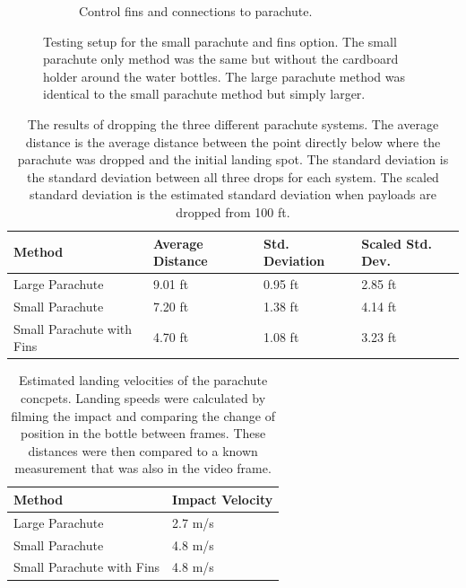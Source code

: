 \documentclass[]{auvsi_doc}
\begin{document}
\begin{figure}[ht]
\begin{subfigure}{0.49\linewidth}
     \caption{Control fins and connections to parachute.}\label{fig:ControlFins}
   \end{subfigure}
\caption{Testing setup for the small parachute and fins option. The small parachute only method was the same but without the cardboard holder around the water bottles. The large parachute method was identical to the small parachute method but simply larger.}
\label{fig:combined}
\end{figure}

\begin{table}[h!]
\caption{The results of dropping the three different parachute systems. The average distance is the average distance between the point directly below where the parachute was dropped and the initial landing spot. The standard deviation is the standard deviation between all three drops for each system. The scaled standard deviation is the estimated standard deviation when payloads are dropped from 100 ft. }
\label{table:results}

\begin{tabular}{| l | l | l | l |}
\hline
\rowcolor[HTML]{C0C0C0}
Method & Average Distance & Std. Deviation & Scaled Std. Dev.\\
\hline
Large Parachute & 9.01 ft  & 0.95 ft & 2.85 ft\\
Small Parachute & 7.20 ft  & 1.38 ft & 4.14 ft\\
Small Parachute with Fins & 4.70 ft & 1.08 ft & 3.23 ft\\
\hline

\end{tabular}

\end{table}

\begin{table}[h!]
\caption{Estimated landing velocities of the parachute concpets. Landing speeds were calculated by filming the impact and comparing the change of position in the bottle between frames. These distances were then compared to a known measurement that was also in the video frame.}
\label{table:results_v}

\begin{tabular}{| l | l |}
\hline
\rowcolor[HTML]{C0C0C0}
Method & Impact Velocity\\
\hline
Large Parachute & 2.7 m/s \\
Small Parachute & 4.8 m/s \\
Small Parachute with Fins & 4.8 m/s \\
\hline

\end{tabular}

\end{table}
\end{document}
